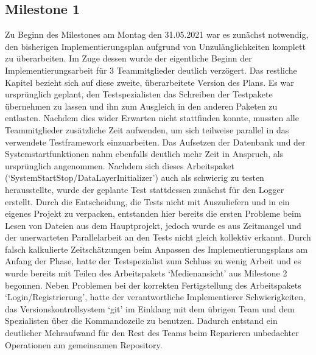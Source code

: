 \documentclass{article}
\begin{document}
\subsection{Milestone 1}
Zu Beginn des Milestones am Montag den 31.05.2021 war es zunächst notwendig, den bisherigen Implementierungsplan aufgrund von Unzulänglichkeiten komplett zu überarbeiten. Im Zuge dessen wurde der eigentliche Beginn der Implementierungsarbeit für 3 Teammitglieder deutlich verzögert. Das restliche Kapitel bezieht sich auf diese zweite, überarbeitete Version des Plans. Es war ursprünglich geplant, den Testspezialisten das Schreiben der Testpakete übernehmen zu lassen und ihn zum Ausgleich in den anderen Paketen zu entlasten. Nachdem dies wider Erwarten nicht stattfinden konnte, mussten alle Teammitglieder zusätzliche Zeit aufwenden, um sich teilweise parallel in das verwendete Testframework einzuarbeiten. Das Aufsetzen der Datenbank und der Systemstartfunktionen nahm ebenfalls deutlich mehr Zeit in Anspruch, als ursprünglich angenommen. Nachdem sich dieses Arbeitspaket (`SystemStartStop/DataLayerInitializer') auch als schwierig zu testen herausstellte, wurde der geplante Test stattdessen zunächst für den Logger erstellt. Durch die Entscheidung, die Tests nicht mit Auszuliefern und in ein eigenes Projekt zu verpacken, entstanden hier bereits die ersten Probleme beim Lesen von Dateien aus dem Hauptprojekt, jedoch wurde es aus Zeitmangel und der unerwarteten Parallelarbeit an den Tests nicht gleich kollektiv erkannt. Durch falsch kalkulierte Zeitschätzungen beim Anpassen des Implementierungsplans am Anfang der Phase, hatte der Testspezialist zum Schluss zu wenig Arbeit und es wurde bereits mit Teilen des Arbeitspakets `Medienansicht' aus Milestone 2 begonnen. Neben Problemen bei der korrekten Fertigstellung des Arbeitspakets `Login/Registrierung', hatte der verantwortliche Implementierer Schwierigkeiten, das Versionskontrollsystem `git' im Einklang mit dem übrigen Team und dem Spezialisten über die Kommandozeile zu benutzen. Dadurch entstand ein deutlicher Mehraufwand für den Rest des Teams beim Reparieren unbedachter Operationen am gemeinsamen Repository.
\end{document}
